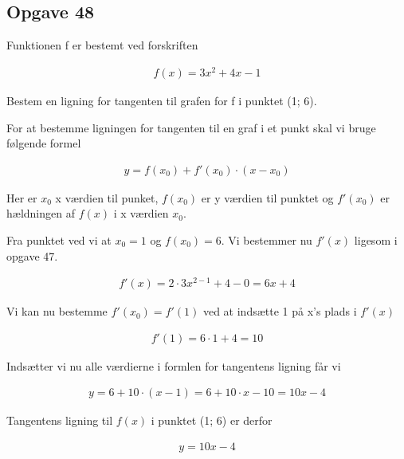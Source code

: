 \subsection{Opgave 48}

Funktionen f er bestemt ved forskriften 

\begin{align*}
    f(x) = 3x^2 + 4x - 1
\end{align*}

Bestem en ligning for tangenten til grafen for f i punktet (1; 6).

\ans

For at bestemme ligningen for tangenten til en graf i et punkt skal vi bruge følgende formel

\begin{align*}
    y = f(x_0) + f'(x_0)\cdot (x - x_0)
\end{align*}

Her er $x_0$ x værdien til punket, $f(x_0)$ er y værdien til punktet og $f'(x_0)$ er hældningen af $f(x)$ i x værdien $x_0$.

Fra punktet ved vi at $x_0 = 1$ og $f(x_0) = 6$. Vi bestemmer nu $f'(x)$ ligesom i opgave 47.

\begin{align*}
    f'(x) = 2 \cdot 3x^{2-1} + 4 - 0 = 6x + 4
\end{align*}

Vi kan nu bestemme $f'(x_0) = f'(1)$ ved at indsætte 1 på x's plads i $f'(x)$

\begin{align*}
    f'(1) = 6\cdot 1 + 4 = 10
\end{align*}

Indsætter vi nu alle værdierne i formlen for tangentens ligning får vi

\begin{align*}
    y = 6 + 10\cdot (x - 1) = 6 + 10\cdot x - 10 = 10x - 4
\end{align*}

Tangentens ligning til $f(x)$ i punktet (1; 6) er derfor

\begin{align*}
    y = 10x - 4
\end{align*}